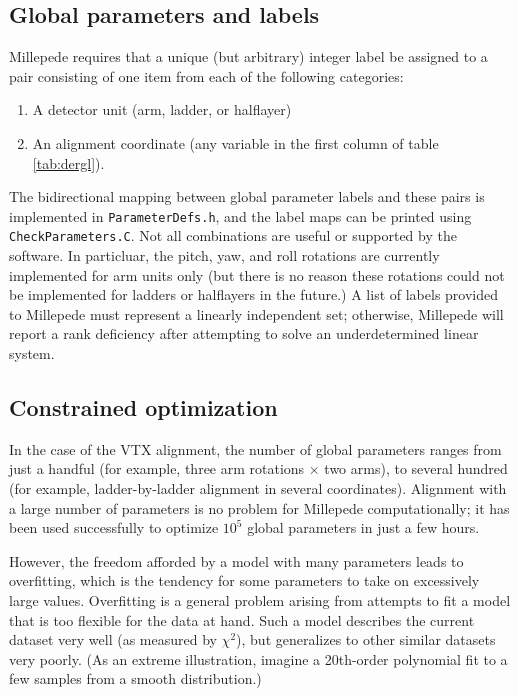 \documentclass[12pt]{article}
\begin{document}
\subsection{Global parameters and labels} \label{sec:labels}
Millepede requires that a unique (but arbitrary) integer label be assigned to a pair consisting of one item from each of the following categories:
\begin{enumerate}
  \item A detector unit (arm, ladder, or halflayer)
  \item An alignment coordinate (any variable in the first column of table \ref{tab:dergl}).
\end{enumerate}
The bidirectional mapping between global parameter labels and these pairs is implemented in \texttt{ParameterDefs.h}, and the label maps can be printed using \texttt{CheckParameters.C}. Not all combinations are useful or supported by the software. In particluar, the pitch, yaw, and roll rotations are currently implemented for arm units only (but there is no reason these rotations could not be implemented for ladders or halflayers in the future.) A list of labels provided to Millepede must represent a linearly independent set; otherwise, Millepede will report a rank deficiency after attempting to solve an underdetermined linear system. 


\subsection{Constrained optimization}
In the case of the VTX alignment, the number of global parameters ranges from just a handful (for example, three arm rotations $\times$ two arms), to several hundred (for example, ladder-by-ladder alignment in several coordinates). Alignment with a large number of parameters is no problem for Millepede computationally; it has been used successfully to optimize $10^5$ global parameters in just a few hours. 

However, the freedom afforded by a model with many parameters leads to overfitting, which is the tendency for some parameters to take on excessively large values. Overfitting is a general problem arising from attempts to fit a model that is too flexible for the data at hand. Such a model describes the current dataset very well (as measured by $\chi^2$), but generalizes to other similar datasets very poorly. (As an extreme illustration, imagine a 20th-order polynomial fit to a few samples from a smooth distribution.)
\end{document}
